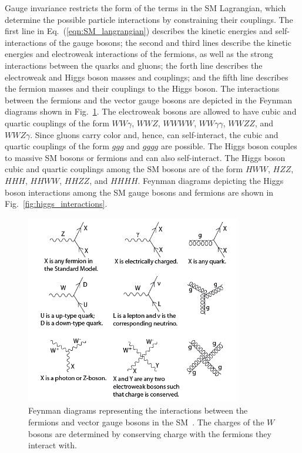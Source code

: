 Gauge invariance restricts the form of the terms in the SM Lagrangian, which determine the possible particle interactions by constraining their couplings. The first line in Eq.~(\ref{eqn:SM_langrangian}) describes the kinetic energies and self-interactions of the gauge bosons; the second and third lines describe the kinetic energies and electroweak interactions of the fermions, as well as the strong interactions between the quarks and gluons; the forth line describes the electroweak and Higgs boson masses and couplings; and the fifth line describes the fermion masses and their couplings to the Higgs boson.  The interactions between the fermions and the vector gauge bosons are depicted in the Feynman diagrams shown in Fig.~\ref{fig:SM_interactions}. The electroweak bosons are allowed to have cubic and quartic couplings of the form $WW\gamma$, $WWZ$, $WWWW$, $WW\gamma\gamma$, $WWZZ$, and $WWZ\gamma$. Since gluons carry color and, hence, can self-interact, the cubic and quartic couplings of the form $ggg$ and $gggg$ are possible. The Higgs boson couples to massive SM bosons or fermions and can also self-interact. The Higgs boson cubic and quartic couplings among the SM bosons are of the form $HWW$, $HZZ$, $HHH$, $HHWW$, $HHZZ$, and $HHHH$. Feynman diagrams depicting the Higgs boson interactions among the SM gauge bosons and fermions are shown in Fig.~\ref{fig:higgs_interactions}.

\begin{figure}[!htb]
	\centering
	\includegraphics[width=0.84\textwidth]{figures/Standard_Model_Feynman_Diagram_Vertices.png}
	\caption{Feynman diagrams representing the interactions between the fermions and vector gauge bosons in the SM~\cite{SM_interactions}. The charges of the $W$ bosons are determined by conserving charge with the fermions they interact with.}
	\label{fig:SM_interactions}
\end{figure}

